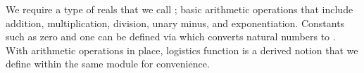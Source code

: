 We require a type of reals that we call ; basic arithmetic operations
that include addition, multiplication, division, unary minus, and exponentiation.
Constants such as zero and one can be defined via  which converts
natural numbers to .  With arithmetic operations in place, logistics function
is a derived notion that we define within the same module for convenience.

\begin{code}[hide]%
\>[0]\AgdaSpace{}%
\AgdaSpace{}%
\AgdaSymbol{(}\AgdaSpace{}%
\AgdaSymbol{:}\AgdaSpace{}%
\AgdaSymbol{)}\AgdaSpace{}%
\<%
\\
\>[0][@{}l@{\AgdaIndent{0}}]%
\>[2]\<%
\\
%
\>[2]\AgdaSpace{}%
\AgdaSpace{}%
\<%
\\
%
\>[2]\AgdaSpace{}%
\AgdaSpace{}%
\AgdaSpace{}%
\AgdaSpace{}%
\AgdaSymbol{(}\AgdaSymbol{;}\AgdaSpace{}%
\AgdaSymbol{;}\AgdaSpace{}%
\AgdaSymbol{;}\AgdaSpace{}%
\AgdaOperator{\AgdaInductiveConstructor{\AgdaUnderscore{},\AgdaUnderscore{}}}\AgdaSymbol{)}\<%
\\
%
\>[2]\AgdaSpace{}%
\AgdaSpace{}%
\AgdaSpace{}%
\AgdaSpace{}%
\AgdaSymbol{(}\AgdaSymbol{;}\AgdaSpace{}%
\AgdaSymbol{;}\AgdaSpace{}%
\AgdaSymbol{;}\AgdaSpace{}%
\AgdaOperator{\AgdaFunction{\#\AgdaUnderscore{}}}\AgdaSymbol{)}\<%
\\
%
\>[2]\AgdaSpace{}%
\AgdaSpace{}%
\<%
\\
%
\>[2]\AgdaSpace{}%
\AgdaSpace{}%
\<%
\\
%
\\[\AgdaEmptyExtraSkip]%
%
\>[2]\AgdaSpace{}%
\<%
\\
%
\>[2]\AgdaSpace{}%
\<%
\\
%
\>[2]\AgdaSpace{}%
\AgdaSpace{}%
\<%
\end{code}

